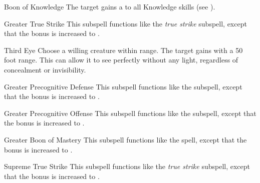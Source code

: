 \begin{ability}[\nth{3}]{Boon of Knowledge}
The target gains a   to all Knowledge skills (see ).
\end{ability}
\vspace{0.25em}


\begin{ability}[\nth{3}]{Greater True Strike}
This subspell functions like the \textit{true strike} subspell, except that the bonus is increased to .
\end{ability}
\vspace{0.25em}


\begin{ability}[\nth{3}]{Third Eye}
Choose a willing creature within \rngclose range.
The target gains  with a 50 foot range.
This can allow it to see perfectly without any light, regardless of concealment or invisibility.
\end{ability}
\vspace{0.25em}


\begin{ability}[\nth{4}]{Greater Precognitive Defense}
This subspell functions like the  subspell, except that the bonus is increased to .
\end{ability}
\vspace{0.25em}


\begin{ability}[\nth{4}]{Greater Precognitive Offense}
This subspell functions like the  subspell, except that the bonus is increased to .
\end{ability}
\vspace{0.25em}


\begin{ability}[\nth{5}]{Greater Boon of Mastery}
This subspell functions like the  spell, except that the bonus is increased to .
\end{ability}
\vspace{0.25em}


\begin{ability}[\nth{5}]{Supreme True Strike}
This subspell functions like the \textit{true strike} subspell, except that the bonus is increased to .
\end{ability}
\vspace{0.25em}

